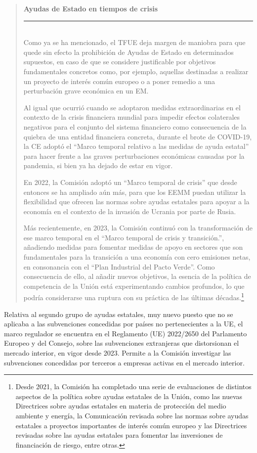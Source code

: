 \documentclass[10pt,a4paper]{article}
\newenvironment{specialblock}[1]{%
      \begin{quote} %
      \small %
      \noindent\textbf{#1}\\[-0.3em] %
      \rule{\linewidth}{0.4pt}\\[0.6em]}{
      \end{quote}}
\begin{document}
\begin{specialblock}{Ayudas de Estado en tiempos de crisis}
    Como ya se ha mencionado, el TFUE deja margen de maniobra para que quede sin efecto la prohibición de Ayudas de Estado en determinados supuestos, en caso de que se considere justificable por objetivos fundamentales concretos como, por ejemplo, aquellas destinadas a realizar un proyecto de interés común europeo o a poner remedio a una perturbación grave económica en un EM.

    Al igual que ocurrió cuando se adoptaron medidas extraordinarias en el contexto de la crisis financiera mundial para impedir efectos colaterales negativos para el conjunto del sistema financiero como consecuencia de la quiebra de una entidad financiera concreta, durante el brote de COVID-19, la CE adoptó el “Marco temporal relativo a las medidas de ayuda estatal” para hacer frente a las graves perturbaciones económicas causadas por la pandemia, si bien ya ha dejado de estar en vigor.

    En 2022, la Comisión adoptó un “Marco temporal de crisis” que desde entonces se ha ampliado aún más, para que los EEMM puedan utilizar la flexibilidad que ofrecen las normas sobre ayudas estatales para apoyar a la economía en el contexto de la invasión de Ucrania por parte de Rusia.

    Más recientemente, en 2023, la Comisión continuó con la transformación de ese marco temporal en el “Marco temporal de crisis y transición.”, añadiendo medidas para fomentar medidas de apoyo en sectores que son fundamentales para la transición a una economía con cero emisiones netas, en consonancia con el “Plan Industrial del Pacto Verde”. Como consecuencia de ello, al añadir nuevos objetivos, la esencia de la política de competencia de la Unión está experimentando cambios profundos, lo que podría considerarse una ruptura con su práctica de las últimas décadas.\footnote{%
        Desde 2021, la Comisión ha completado una serie de evaluaciones de distintos aspectos de la política sobre ayudas estatales de la Unión, como las nuevas Directrices sobre ayudas estatales en materia de protección del medio ambiente y energía, la Comunicación revisada sobre las normas sobre ayudas estatales a proyectos importantes de interés común europeo y las Directrices revisadas sobre las ayudas estatales para fomentar las inversiones de financiación de riesgo, entre otras.
    }
\end{specialblock}

Relativa al segundo grupo de ayudas estatales, muy nuevo puesto que no se aplicaba a las subvenciones concedidas por países no pertenecientes a la UE, el marco regulador se encuentra en el Reglamento (UE) 2022/2650 del Parlamento Europeo y del Consejo, sobre las subvenciones extranjeras que distorsionan el mercado interior, en vigor desde 2023. Permite a la Comisión investigar las subvenciones concedidas por terceros a empresas activas en el mercado interior.
\end{document}

